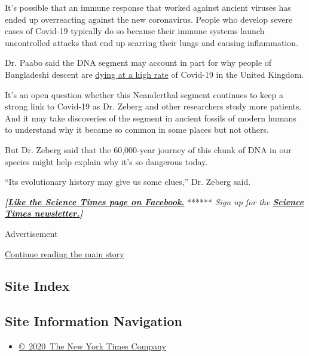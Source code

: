 It's possible that an immune response that worked against ancient
viruses has ended up overreacting against the new coronavirus. People
who develop severe cases of Covid-19 typically do so because their
immune systems launch uncontrolled attacks that end up scarring their
lungs and causing inflammation.

Dr. Paabo said the DNA segment may account in part for why people of
Bangladeshi descent are
\href{https://www.theguardian.com/world/2020/jun/19/south-asians-in-uk-most-likely-to-die-of-covid-19-study-finds}{dying
at a high rate} of Covid-19 in the United Kingdom.

It's an open question whether this Neanderthal segment continues to keep
a strong link to Covid-19 as Dr. Zeberg and other researchers study more
patients. And it may take discoveries of the segment in ancient fossils
of modern humans to understand why it became so common in some places
but not others.

But Dr. Zeberg said that the 60,000-year journey of this chunk of DNA in
our species might help explain why it's so dangerous today.

``Its evolutionary history may give us some clues,'' Dr. Zeberg said.

\textbf{\emph{{[}}\href{http://on.fb.me/1paTQ1h}{\emph{Like the Science
Times page on Facebook.}}} ****** \emph{\textbar{} Sign up for the}
\textbf{\href{http://nyti.ms/1MbHaRU}{\emph{Science Times
newsletter.}}\emph{{]}}}

Advertisement

\protect\hyperlink{after-bottom}{Continue reading the main story}

\hypertarget{site-index}{%
\subsection{Site Index}\label{site-index}}

\hypertarget{site-information-navigation}{%
\subsection{Site Information
Navigation}\label{site-information-navigation}}

\begin{itemize}
\tightlist
\item
  \href{https://help.nytimes.com/hc/en-us/articles/115014792127-Copyright-notice}{©~2020~The
  New York Times Company}
\end{itemize}

